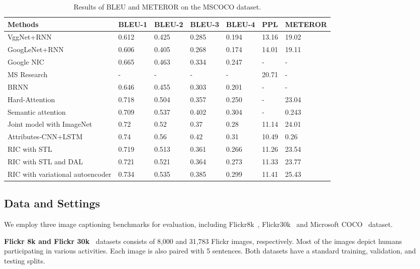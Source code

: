 \documentclass[10pt,twocolumn,letterpaper]{article}
\begin{document}
	\begin{table*}[]
		\centering
		\caption{Results of  BLEU \cite{papineni2002bleu} and METEROR \cite{banerjee2005meteor} on the MSCOCO \cite{chen2015microsoft} dataset.
		}
		\label{MSCOCO}
		\begin{tabular}{@{}lllllll@{}}
			\toprule
			Methods         &  BLEU-1   & BLEU-2   & BLEU-3  & BLEU-4 & PPL & METEROR\\ \midrule
			VggNet+RNN     & 0.612 & 0.425 & 0.285 & 0.194 & 13.16 & 19.02 \\
			GoogLeNet+RNN           & 0.606 & 0.405 & 0.268 & 0.174 &14.01 & 19.11\\
			Google NIC \cite{vinyals2015show}  & 0.665 & 0.463 & 0.334 & 0.247 & - & - \\
			MS Research \cite{fang2015captions} & - &- & -& -& 20.71 & - \\
			BRNN \cite{karpathy2015deep} &0.646 & 0.455 & 0.303 & 0.201 &- & - \\
			Hard-Attention\cite{xu2015show}         & 0.718 & 0.504 & 0.357 & 0.250 & - & 23.04 \\
			Semantic attention \cite{you2016image} & 0.709 &0.537 & 0.402& 0.304 & - & 0.243 \\
			Joint model with ImageNet \cite{pu2016variational}            & 0.72 & 0.52 & 0.37 & 0.28 & 11.14 & 24.01 \\
			Attributes-CNN+LSTM \cite{wu2015value}  & 0.74 & 0.56& 0.42& 0.31 & 10.49 & 0.26  \\
			RIC with STL  & 0.719 & 0.513 & 0.361 & 0.266 & 11.26 & 23.54 \\
			RIC with STL and DAL  & 0.721 & 0.521 & 0.364 & 0.273 & 11.33 & 23.77 \\
			RIC with variational autoencoder   & 0.734 & 0.535 & 0.385 & 0.299 & 11.41 & 25.43 \\ \bottomrule
		\end{tabular}
	\end{table*}
	
	
	\subsection{Data and Settings}
	We employ three image captioning benchmarks for evaluation, including Flickr8k~\cite{hodosh2013framing}, Flickr30k~\cite{young2014image} and Microsoft COCO~\cite{lin2014microsoft} dataset.
	
	\noindent\textbf{Flickr 8k and Flickr 30k~\cite{rashtchian2010collecting}} datasets consists of 8,000 and 31,783 Flickr images, respectively. Most of the images depict humans participating in various activities. Each image is also paired with 5 sentences. Both datasets have a standard training, validation, and testing splits.
	
\end{document}

